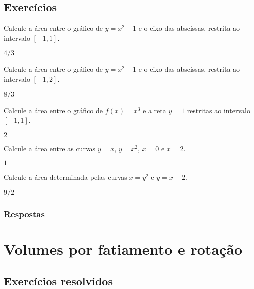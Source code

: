 \subsection{Exercícios}

\begin{exer}
  Calcule a área entre o gráfico de $y = x^2-1$ e o eixo das abscissas, restrita ao intervalo $[-1, 1]$.
\end{exer}
\begin{resp}
  $4/3$
\end{resp}

\begin{exer}
  Calcule a área entre o gráfico de $y = x^2-1$ e o eixo das abscissas, restrita ao intervalo $[-1, 2]$.
\end{exer}
\begin{resp}
  $8/3$
\end{resp}

\begin{exer}
  Calcule a área entre o gráfico de $f(x)=x^3$ e a reta $y=1$ restritas ao intervalo $[-1,1]$.
\end{exer}
\begin{resp}
  $2$
\end{resp}

\begin{exer}
  Calcule a área entre as curvas $y=x$, $y=x^2$, $x=0$ e $x=2$.
\end{exer}
\begin{resp}
  $1$
\end{resp}

\begin{exer}
  Calcule a área determinada pelas curvas $x=y^2$ e $y = x - 2$.
\end{exer}
\begin{resp}
  $9/2$
\end{resp}

\ifisbook
\subsubsection{Respostas}
\shipoutAnswer
\fi


\section{Volumes por fatiamento e rotação}\label{cap_apint_sec_volfat}
\badgeConstrucao

\subsection{Exercícios resolvidos}
\badgeConstrucao

